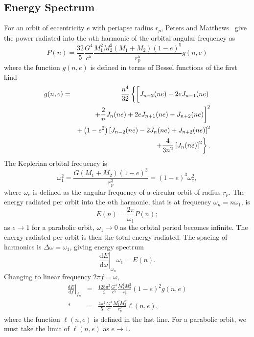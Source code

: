 \documentclass[aps,prd,amsfonts,amssymb,amsmath,nofootinbib,floatfix,reprint,showpacs,groupedaddress]{revtex4-1}
\newcommand{\dd}{\ensuremath{\mathrm{d}}}
\newcommand{\diff}[2]{\ensuremath{\frac{\dd {#1}}{\dd {#2}}}}
\begin{document}
\subsection{Energy Spectrum}

For an orbit of eccentricity $e$ with periapse radius $r_{p}$, Peters and Matthews~\cite{Peters1963} give the power radiated into the $n$th harmonic of the orbital angular frequency as
\begin{equation}
P(n) = \frac{32}{5}\frac{G^4}{c^5}\frac{M_1^2M_2^2(M_1 + M_2)(1-e)^5}{r_{p}^5}g(n,e)
\label{eq:PM_P}
\end{equation}
where the function $g(n,e)$ is defined in terms of Bessel functions of the first kind
\begin{eqnarray}
g(n,e) & = & \frac{n^4}{32}\left\{\left[J_{n-2}(ne) - 2eJ_{n-1}(ne) \vphantom{\frac{2}{n}J_n(ne)} \right. \right. \nonumber \\*
 & & \left. + \frac{2}{n}J_n(ne) + 2eJ_{n+1}(ne) - J_{n+2}(ne)\right]^2 \nonumber \\*
 & & + \left(1 - e^2\right)\left[J_{n-2}(ne) - 2J_n(ne) + J_{n+2}(ne)\right]^2 \nonumber \\*
 & & \left. + \frac{4}{3n^2}\left[J_n(ne)\right]^2\right\}.
\end{eqnarray}
The Keplerian orbital frequency is
\begin{equation}
\omega_1^2 = \frac{G(M_1 + M_2)(1 - e)^3}{r_{p}^3} = (1 - e)^3\omega_{c}^2,
\label{eq:Kepler_freq}
\end{equation}
where $\omega_{c}$ is defined as the angular frequency of a circular orbit of radius $r_{p}$. The energy radiated per orbit into the $n$th harmonic, that is at frequency $\omega_n = n\omega_1$, is
\begin{equation}
E(n) = \frac{2\pi}{\omega_1}P(n);
\label{eq:E(n)}
\end{equation}
as $e \rightarrow 1$ for a parabolic orbit, $\omega_1 \rightarrow 0$ as the orbital period becomes infinite. The energy radiated per orbit is then the total energy radiated. The spacing of harmonics is $\Delta\omega = \omega_1$, giving energy spectrum
\begin{equation}
\left.\diff{E}{\omega}\right|_{\omega_n}\omega_1 = E(n).
\end{equation}
Changing to linear frequency $2\pi f = \omega$,
\begin{eqnarray}
\left.\diff{E}{f}\right|_{f_n} & = & \frac{128\pi^2}{5}\frac{G^3}{c^5}\frac{M_1^2M_2^2}{r_{p}^2}(1-e)^2g(n,e) \\*
 & = & \frac{4\pi^2}{5}\frac{G^3}{c^5}\frac{M_1^2M_2^2}{r_{p}^2}\ell(n,e),
\label{eq:PM_spectrum}
\end{eqnarray}
where the function $\ell(n,e)$ is defined in the last line. For a parabolic orbit, we must take the limit of $\ell(n,e)$ as $e \rightarrow 1$.
\end{document}
